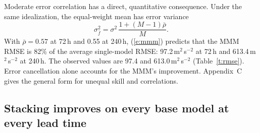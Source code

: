 \documentclass[twocol]{ametsocV6.1}
\newcommand{\units}{m$^{2}$\,s$^{-2}$}
\begin{document}
Moderate error correlation has a direct, quantitative consequence. Under the same idealization, the equal-weight mean has error variance
\begin{equation}
\sigma^2_{\bar f} = \sigma^2\,\frac{1+(M-1)\bar\rho}{M}. \label{e:mmm}
\end{equation}
With $\bar\rho = 0.57$ at 72\,h and 0.55 at 240\,h, (\ref{e:mmm}) predicts that the MMM RMSE is 82\% of the average single-model RMSE: 97.2\,\units{} at 72\,h and 613.4\,\units{} at 240\,h. The observed values are 97.4 and 613.0\,\units{} (Table~\ref{t:rmse}). Error cancellation alone accounts for the MMM's improvement. Appendix~C gives the general form for unequal skill and correlations.

\subsection{Stacking improves on every base model at every lead time}
\end{document}

